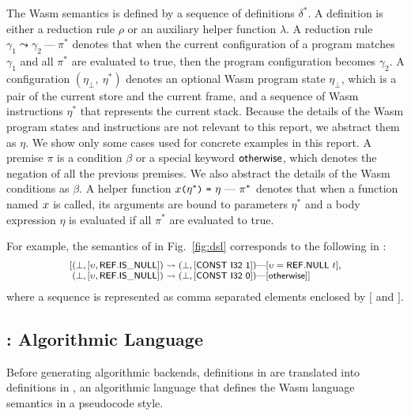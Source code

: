 The Wasm semantics is defined by a sequence of definitions $\delta^*$.
A definition is either a reduction rule $\rho$ or an auxiliary helper function $\lambda$.
A reduction rule $\gamma_1 \leadsto \gamma_2\ \mbox{---}\ \pi^*$ denotes that
when the current configuration of a program matches $\gamma_1$ and
all $\pi^*$ are evaluated to true, then the program configuration becomes $\gamma_2$.
A configuration $(\eta_\bot,\ \eta^*)$ denotes an optional Wasm program state $\eta_\bot$,
which is a pair of the current store and the current frame,
and a sequence of Wasm instructions $\eta^*$ that represents the current stack.
Because the details of the Wasm program states and instructions are
not relevant to this report,
we abstract them as $\eta$. We show only some cases used for concrete
examples in this report.
A premise $\pi$ is a condition $\beta$ or a special keyword
\ensuremath{\mathsf{\small otherwise}},
which denotes the negation of all the previous premises.
We also abstract the details of the Wasm conditions as $\beta$.
A helper function $\varx \kwrl \eta^* \kwrr\ \kwequ\ \eta\ \mbox{---}\ \pi^*$ denotes that
when a function named $x$ is called, its arguments are bound to parameters $\eta^*$
and a body expression $\eta$ is evaluated if all $\pi^*$ are evaluated to true.

For example, the semantics of 
in Fig.~\ref{fig:dsl} corresponds to the following in \dl:
\[
\footnotesize
\begin{array}{l@{}l@{~}c@{~}l}
[&(\bot, [\upsilon, \ssf{REF.IS\_NULL}]) &\leadsto& (\bot, [\ssf{CONST\ I32\ 1}])
\mbox{---} [\upsilon = \ssf{REF.NULL}\ t],\\
&(\bot, [\upsilon, \ssf{REF.IS\_NULL}])&\leadsto&(\bot, [\ssf{CONST\ I32\ 0}])
\mbox{---}[\ssf{\small otherwise}] ]
\end{array}
\]
where a sequence is represented as comma separated elements
enclosed by $[$ and $]$.

\subsection{\al: Algorithmic Language}\label{sec:aldef} %
Before generating algorithmic backends, definitions in \dl are translated into definitions in \al,
an algorithmic language that defines the Wasm language semantics in a pseudocode style.

